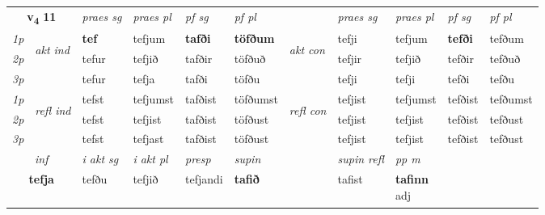 \noindent
\begin{tabular}{lllllllllll} \toprule
\multicolumn{2}{c}{\textbf{v{\textsubscript{4}}} \Large{\textbf{11}}}  &  \textit{praes sg}  & \textit{praes pl}  &\textit{ pf sg} & \textit{pf pl} &  &  \textit{praes sg}  & \textit{praes pl}  & \textit{pf sg} & \textit{pf pl } \\*
	\cmidrule{3-6} \cmidrule{8-11}
 {\textit{1p}} & \multirow{3}{*}{\begin{turn}{90}\textit{akt ind}\end{turn}} & \textbf{tef} & tefjum & \textbf{tafði} & \textbf{töfðum} & \multirow{3}{*}{\begin{turn}{90}\textit{akt con}\end{turn}} &tefji & tefjum & \textbf{tefði} & tefðum\\*
 {\textit{2p}} &  &  tefur  & tefjið & tafðir & töfðuð & & tefjir & tefjið & tefðir & tefðuð \\*
{\textit{3p}} &  & tefur & tefja & tafði & töfðu & & tefji & tefji& tefði & tefðu \\*
\cmidrule{3-6} \cmidrule{8-11}
 {\textit{1p}} & \multirow{3}{*}{\begin{turn}{90}\textit{refl ind}\end{turn}}  & tefst & tefjumst & tafðist & töfðumst & \multirow{3}{*}{\begin{turn}{90}\textit{refl con}\end{turn}}  &tefjist & tefjumst & tefðist & tefðumst \\*
 {\textit{2p}} &  & tefst & tefjist & tafðist & töfðust & &tefjist & tefjist & tefðist & tefðust \\*
 {\textit{3p}}  & & tefst & tefjast & tafðist & töfðust & & tefjist & tefjist& tefðist & tefðust \\*
\cmidrule{3-6} \cmidrule{8-11}

   \multicolumn{2}{c}{\textit{inf}}  & \textit{i akt sg} & \textit{i akt pl}   & \textit{presp} & \textit{supin} && \textit{supin refl} & \textit{pp m} \\*
  \multicolumn{2}{c}{\textbf{tefja}} & tefðu  & tefjið   & tefjandi &  \textbf{tafið} && tafist & \specialcell{\textbf{tafinn} \\ adj\textbf{\textsubscript{}}} \\*
\end{tabular}

